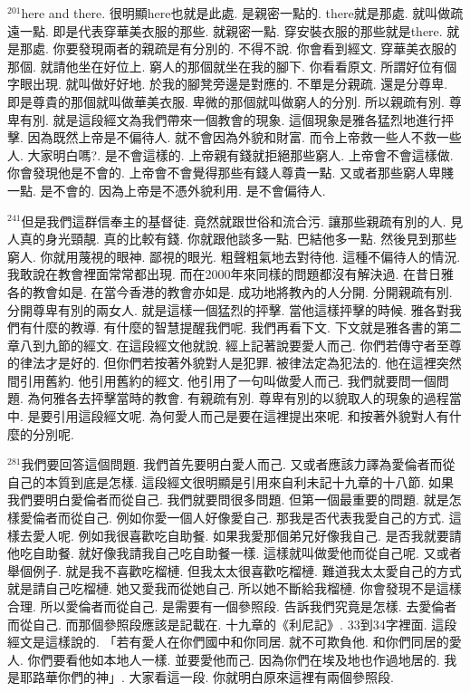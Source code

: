 \documentclass{book}
\begin{document}
$^{201}$here and there.
很明顯here也就是此處.
是親密一點的.
there就是那處.
就叫做疏遠一點.
即是代表穿華美衣服的那些.
就親密一點.
穿安裝衣服的那些就是there.
就是那處.
你要發現兩者的親疏是有分別的.
不得不說.
你會看到經文.
穿華美衣服的那個.
就請他坐在好位上.
窮人的那個就坐在我的腳下.
你看看原文.
所謂好位有個字眼出現.
就叫做好好地.
於我的腳凳旁邊是對應的.
不單是分親疏.
還是分尊卑.
即是尊貴的那個就叫做華美衣服.
卑微的那個就叫做窮人的分別.
所以親疏有別.
尊卑有別.
就是這段經文為我們帶來一個教會的現象.
這個現象是雅各猛烈地進行抨擊.
因為既然上帝是不偏待人.
就不會因為外貌和財富.
而令上帝救一些人不救一些人.
大家明白嗎?.
是不會這樣的.
上帝親有錢就拒絕那些窮人.
上帝會不會這樣做.
你會發現他是不會的.
上帝會不會覺得那些有錢人尊貴一點.
又或者那些窮人卑賤一點.
是不會的.
因為上帝是不憑外貌利用.
是不會偏待人.

$^{241}$但是我們這群信奉主的基督徒.
竟然就跟世俗和流合污.
讓那些親疏有別的人.
見人真的身光頸靚.
真的比較有錢.
你就跟他談多一點.
巴結他多一點.
然後見到那些窮人.
你就用蔑視的眼神.
鄙視的眼光.
粗聲粗氣地去對待他.
這種不偏待人的情況.
我敢說在教會裡面常常都出現.
而在2000年來同樣的問題都沒有解決過.
在昔日雅各的教會如是.
在當今香港的教會亦如是.
成功地將教內的人分開.
分開親疏有別.
分開尊卑有別的兩女人.
就是這樣一個猛烈的抨擊.
當他這樣抨擊的時候.
雅各對我們有什麼的教導.
有什麼的智慧提醒我們呢.
我們再看下文.
下文就是雅各書的第二章八到九節的經文.
在這段經文他就說.
經上記著說要愛人而己.
你們若傳守者至尊的律法才是好的.
但你們若按著外貌對人是犯罪.
被律法定為犯法的.
他在這裡突然間引用舊約.
他引用舊約的經文.
他引用了一句叫做愛人而己.
我們就要問一個問題.
為何雅各去抨擊當時的教會.
有親疏有別.
尊卑有別的以貌取人的現象的過程當中.
是要引用這段經文呢.
為何愛人而己是要在這裡提出來呢.
和按著外貌對人有什麼的分別呢.

$^{281}$我們要回答這個問題.
我們首先要明白愛人而己.
又或者應該力譯為愛倫者而從自己的本質到底是怎樣.
這段經文很明顯是引用來自利未記十九章的十八節.
如果我們要明白愛倫者而從自己.
我們就要問很多問題.
但第一個最重要的問題.
就是怎樣愛倫者而從自己.
例如你愛一個人好像愛自己.
那我是否代表我愛自己的方式.
這樣去愛人呢.
例如我很喜歡吃自助餐.
如果我愛那個弟兄好像我自己.
是否我就要請他吃自助餐.
就好像我請我自己吃自助餐一樣.
這樣就叫做愛他而從自己呢.
又或者舉個例子.
就是我不喜歡吃榴槤.
但我太太很喜歡吃榴槤.
難道我太太愛自己的方式就是請自己吃榴槤.
她又愛我而從她自己.
所以她不斷給我榴槤.
你會發現不是這樣合理.
所以愛倫者而從自己.
是需要有一個參照段.
告訴我們究竟是怎樣.
去愛倫者而從自己.
而那個參照段應該是記載在.
十九章的《利尼記》.
33到34字裡面.
這段經文是這樣說的.
「若有愛人在你們國中和你同居.
就不可欺負他.
和你們同居的愛人.
你們要看他如本地人一樣.
並要愛他而己.
因為你們在埃及地也作過地居的.
我是耶路華你們的神」.
大家看這一段.
你就明白原來這裡有兩個參照段.
\end{document}
